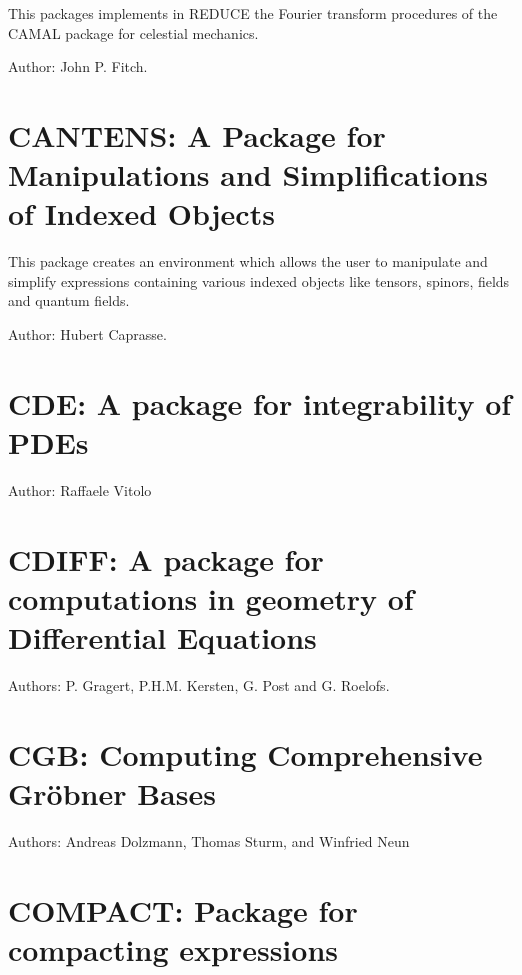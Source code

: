This packages implements in REDUCE the Fourier transform procedures of the
CAMAL package for celestial mechanics.

Author: John P. Fitch.



\newpage

\section{CANTENS: A Package for Manipulations 
and Simplifications of Indexed Objects}


This package creates an environment which allows the user to
manipulate and simplify expressions containing various indexed objects
like tensors, spinors, fields and quantum fields.

Author: Hubert Caprasse.



\newpage

\section{CDE: A package for integrability of PDEs}

Author: Raffaele Vitolo



\newpage

\section{CDIFF: A package for computations in geometry
  of Differential Equations}
\label{CDIFF}


Authors: P. Gragert, P.H.M. Kersten, G. Post and G. Roelofs.



\newpage

\section{CGB: Computing Comprehensive Gr\"obner Bases}

Authors: Andreas Dolzmann, Thomas Sturm, and Winfried Neun



\newpage

\section{COMPACT: Package for compacting expressions} 

